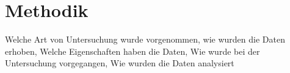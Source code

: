 \section{Methodik} \label{Methodik}
    Welche Art von Untersuchung wurde vorgenommen, wie wurden die Daten erhoben, Welche Eigenschaften haben die Daten, Wie wurde bei der Untersuchung vorgegangen, Wie wurden die Daten analysiert 
